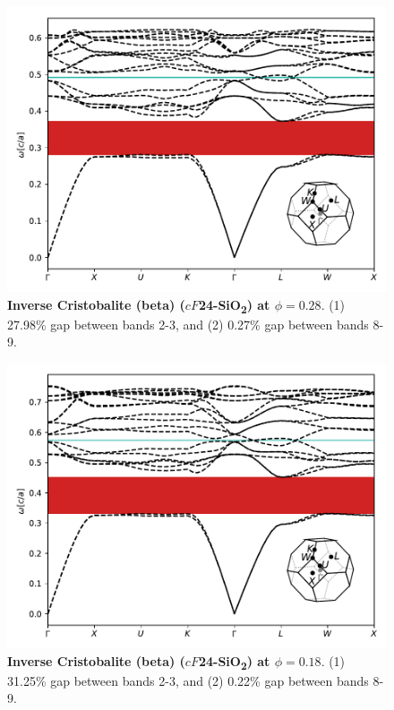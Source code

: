 \documentclass[fleqn,amsmath,amssymb,superscriptaddress, reprint,prl]{revtex4-1}
\begin{document}
\begin{figure}
\includegraphics[width=0.9\linewidth]{workspace/4fd08dff3e254e442a6da51a86916f38/images/r=35.pdf}
	\caption{\textbf{Inverse Cristobalite (beta) ($cF$24-SiO\textsubscript{2}) at $\phi=0.28$}. (1) 27.98\% gap between bands 2-3, and (2) 0.27\% gap between bands 8-9.}
\end{figure}

\begin{figure}
\includegraphics[width=0.9\linewidth]{workspace/4fd08dff3e254e442a6da51a86916f38/images/r=39.pdf}
	\caption{\textbf{Inverse Cristobalite (beta) ($cF$24-SiO\textsubscript{2}) at $\phi=0.18$}. (1) 31.25\% gap between bands 2-3, and (2) 0.22\% gap between bands 8-9.}
\end{figure}
\end{document}

